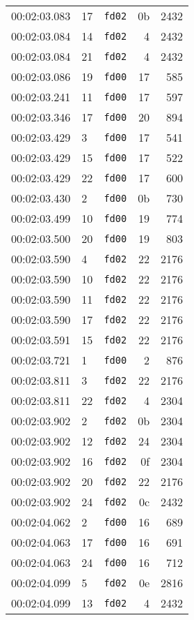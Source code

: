 \documentclass{article}
\begin{document}
\begin{longtable}{lllrr}
00:02:03.083 & 17 & \texttt{fd02} & 0b & 2432 \\
00:02:03.084 & 14 & \texttt{fd02} & 4 & 2432 \\
00:02:03.084 & 21 & \texttt{fd02} & 4 & 2432 \\
00:02:03.086 & 19 & \texttt{fd00} & 17 & 585 \\
00:02:03.241 & 11 & \texttt{fd00} & 17 & 597 \\
00:02:03.346 & 17 & \texttt{fd00} & 20 & 894 \\
00:02:03.429 & 3 & \texttt{fd00} & 17 & 541 \\
00:02:03.429 & 15 & \texttt{fd00} & 17 & 522 \\
00:02:03.429 & 22 & \texttt{fd00} & 17 & 600 \\
00:02:03.430 & 2 & \texttt{fd00} & 0b & 730 \\
00:02:03.499 & 10 & \texttt{fd00} & 19 & 774 \\
00:02:03.500 & 20 & \texttt{fd00} & 19 & 803 \\
00:02:03.590 & 4 & \texttt{fd02} & 22 & 2176 \\
00:02:03.590 & 10 & \texttt{fd02} & 22 & 2176 \\
00:02:03.590 & 11 & \texttt{fd02} & 22 & 2176 \\
00:02:03.590 & 17 & \texttt{fd02} & 22 & 2176 \\
00:02:03.591 & 15 & \texttt{fd02} & 22 & 2176 \\
00:02:03.721 & 1 & \texttt{fd00} & 2 & 876 \\
00:02:03.811 & 3 & \texttt{fd02} & 22 & 2176 \\
00:02:03.811 & 22 & \texttt{fd02} & 4 & 2304 \\
00:02:03.902 & 2 & \texttt{fd02} & 0b & 2304 \\
00:02:03.902 & 12 & \texttt{fd02} & 24 & 2304 \\
00:02:03.902 & 16 & \texttt{fd02} & 0f & 2304 \\
00:02:03.902 & 20 & \texttt{fd02} & 22 & 2176 \\
00:02:03.902 & 24 & \texttt{fd02} & 0c & 2432 \\
00:02:04.062 & 2 & \texttt{fd00} & 16 & 689 \\
00:02:04.063 & 17 & \texttt{fd00} & 16 & 691 \\
00:02:04.063 & 24 & \texttt{fd00} & 16 & 712 \\
00:02:04.099 & 5 & \texttt{fd02} & 0e & 2816 \\
00:02:04.099 & 13 & \texttt{fd02} & 4 & 2432 \\

\end{longtable}
\end{document}
